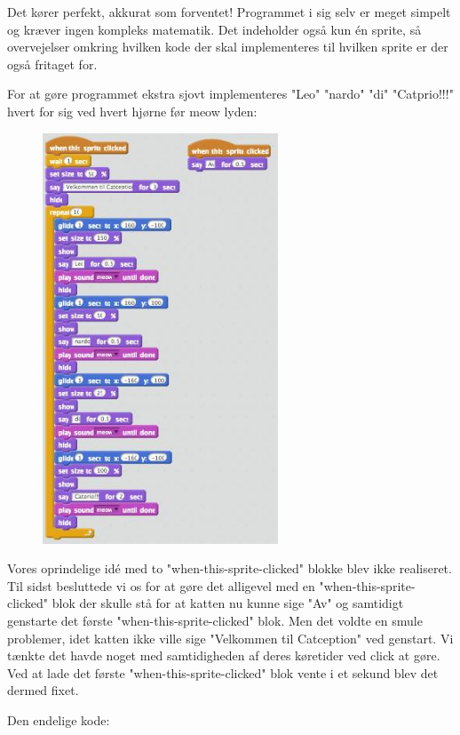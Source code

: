\documentclass[12pt, a4paper, hidelinks]{article}
\begin{document}
Det kører perfekt, akkurat som forventet! Programmet i sig selv er meget simpelt og kræver ingen kompleks matematik. Det indeholder også kun én sprite, så overvejelser omkring hvilken kode der skal implementeres til hvilken sprite er der også fritaget for.

For at gøre programmet ekstra sjovt implementeres "Leo" "nardo" "di" "Catprio!!!" hvert for sig ved hvert hjørne før meow lyden:

\begin{figure}
  \begin{center}
    \includegraphics[width=70mm]{B2.png}
  \end{center}
  \caption{}
  \label{fig:B2}
\end{figure}

\FloatBarrier

Vores oprindelige idé med to "when-this-sprite-clicked" blokke blev ikke realiseret. Til sidst besluttede vi os for at gøre det alligevel med en "when-this-sprite-clicked" blok der skulle stå for at katten nu kunne sige "Av" og samtidigt genstarte det første "when-this-sprite-clicked" blok. Men det voldte en smule problemer, idet katten ikke ville sige "Velkommen til Catception" ved genstart. Vi tænkte det havde noget med samtidigheden af deres køretider ved click at gøre. Ved at lade det første "when-this-sprite-clicked" blok vente i et sekund blev det dermed fixet. 

Den endelige kode:
\end{document}
